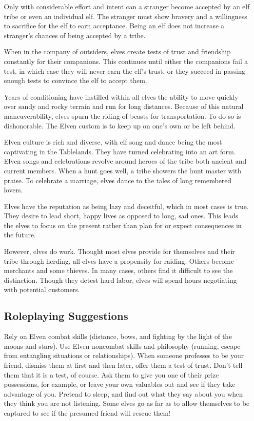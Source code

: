 Only with considerable effort and intent can a stranger become accepted by an elf tribe or even an individual elf. The stranger must show bravery and a willingness to sacrifice for the elf to earn acceptance. Being an elf does not increase a stranger's chances of being accepted by a tribe.

When in the company of outsiders, elves create tests of trust and friendship constantly for their companions. This continues until either the companions fail a test, in which case they will never earn the elf's trust, or they succeed in passing enough tests to convince the elf to accept them.

Years of conditioning have instilled within all elves the ability to move quickly over sandy and rocky terrain and run for long distances. Because of this natural maneuverability, elves spurn the riding of beasts for transportation. To do so is dishonorable. The Elven custom is to keep up on one's own or be left behind.

Elven culture is rich and diverse, with elf song and dance being the most captivating in the Tablelands. They have turned celebrating into an art form. Elven songs and celebrations revolve around heroes of the tribe both ancient and current members. When a hunt goes well, a tribe showers the hunt master with praise. To celebrate a marriage, elves dance to the tales of long remembered lovers.

Elves have the reputation as being lazy and deceitful, which in most cases is true. They desire to lead short, happy lives as opposed to long, sad ones. This leads the elves to focus on the present rather than plan for or expect consequences in the future.

However, elves do work. Thought most elves provide for themselves and their tribe through herding, all elves have a propensity for raiding. Others become merchants and some thieves. In many cases, others find it difficult to see the distinction. Though they detest hard labor, elves will spend hours negotiating with potential customers.

\subsection{Roleplaying Suggestions}
Rely on Elven combat skills (distance, bows, and fighting by the light of the moons and stars). Use Elven noncombat skills and philosophy (running, escape from entangling situations or relationships). When someone professes to be your friend, dismiss them at first and then later, offer them a test of trust. Don't tell them that it is a test, of course. Ask them to give you one of their prize possessions, for example, or leave your own valuables out and see if they take advantage of you. Pretend to sleep, and find out what they say about you when they think you are not listening. Some elves go as far as to allow themselves to be captured to see if the presumed friend will rescue them!

